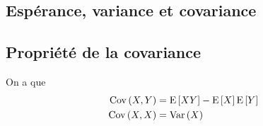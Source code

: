 \documentclass[10pt, french]{article}
\begin{document}
\begin{multicols*}{3} %


\section{Espérance, variance et covariance}

\subsection{Propriété de la covariance}
On a que
\begin{align*}
  \mathrm{Cov} \left( X,Y \right) & = \mathrm{E} \left[ XY \right] - \mathrm{E} \left[ X \right] \mathrm{E} \left[ Y \right] \\
  \mathrm{Cov} \left( X,X \right)  & = \mathrm{Var} \left( X \right)
\end{align*}







\end{multicols*}
\end{document}
